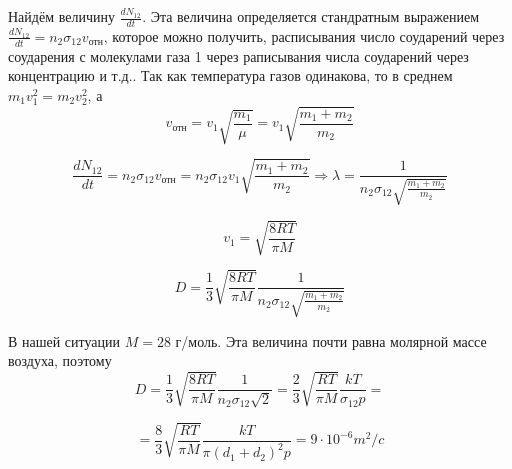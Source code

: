 \documentclass[a4paper, 12pt]{article} %
\begin{document}
Найдём величину $\frac{dN_{12}}{dt}$. Эта величина определяется стандратным выражением $\frac{dN_{12}}{dt} = n_2 \sigma_{12} v_{\text{отн}}$, которое можно получить, расписывания число соударений через соударения с молекулами газа 1 через раписывания числа соударений через концентрацию и т.д.. Так как температура газов  одинакова, то в среднем $m_1 v_1^2 = m_2 v_2^2$, а
\begin{equation}
	v_{\text{отн}} = v_1 \sqrt{\frac{m_1}{\mu}} = v_1 \sqrt{\frac{m_1 + m_2}{m_2}}
\end{equation}

\begin{equation}
	\frac{dN_{12}}{dt} = n_2 \sigma_{12} v_{\text{отн}} = n_2 \sigma_{12} v_1 \sqrt{\frac{m_1 + m_2}{m_2}} \Rightarrow \lambda = \frac{1}{n_2 \sigma_{12} \sqrt{\frac{m_1 + m_2}{m_2}}}
\end{equation}

\begin{equation}
	v_1 = \sqrt{\frac{8RT}{\pi M}}
\end{equation}

\begin{equation}
	D = \frac{1}{3} \sqrt{\frac{8RT}{\pi M}} \frac{1}{n_2 \sigma_{12} \sqrt{\frac{m_1 + m_2}{m_2}}}
\end{equation}

В нашей ситуации $M = 28$ г/моль. Эта величина почти равна молярной массе воздуха, поэтому 
\begin{equation}
	D = \frac{1}{3} \sqrt{\frac{8RT}{\pi M}} \frac{1}{n_2 \sigma_{12} \sqrt{2}} = \frac{2}{3} \sqrt{\frac{RT}{\pi M}} \frac{kT}{\sigma_{12} p} =
\end{equation}

\[ = \frac{8}{3} \sqrt{\frac{RT}{\pi M}} \frac{kT}{\pi (d_1 + d_2)^2 p} = 9 \cdot 10^{-6} m^2/c\]
\end{document}
